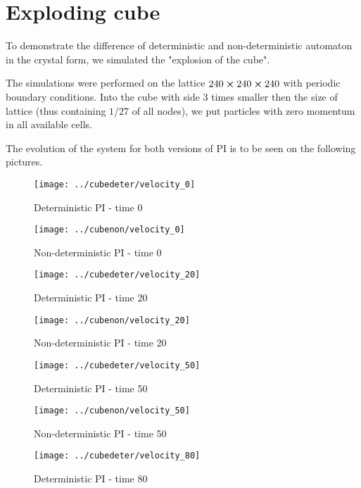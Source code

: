 \section{Exploding cube}
To demonstrate the difference of deterministic and non-deterministic automaton in the crystal form, we simulated the "explosion of the cube". 

The simulations were performed on the lattice $240 \cross 240 \cross 240$ with periodic boundary conditions.
Into the cube with side 3 times smaller then the size of lattice (thus containing $1/27$ of all nodes), we put particles with zero momentum in all available cells.

The evolution of the system for both versions of PI is to be seen on the following pictures.
\begin{figure}[H]
 \centering 
 \texttt{[image: ../cubedeter/velocity\_0]}
 \caption{Deterministic PI - time 0}
\end{figure}

\begin{figure}[H]
 \centering 
 \texttt{[image: ../cubenon/velocity\_0]}
 \caption{Non-deterministic PI - time 0}
\end{figure}

\begin{figure}[H]
 \centering 
 \texttt{[image: ../cubedeter/velocity\_20]}
 \caption{Deterministic PI - time 20}
\end{figure}

\begin{figure}[H]
 \centering 
 \texttt{[image: ../cubenon/velocity\_20]}
 \caption{Non-deterministic PI - time 20}
\end{figure}

\begin{figure}[H]
 \centering 
 \texttt{[image: ../cubedeter/velocity\_50]}
 \caption{Deterministic PI - time 50}
\end{figure}

\begin{figure}[H]
 \centering 
 \texttt{[image: ../cubenon/velocity\_50]}
 \caption{Non-deterministic PI - time 50}
\end{figure}

\begin{figure}[H]
 \centering 
 \texttt{[image: ../cubedeter/velocity\_80]}
 \caption{Deterministic PI - time 80}
\end{figure}

